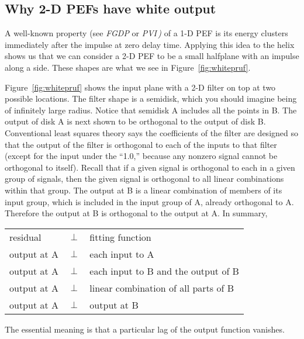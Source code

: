 \subsection{Why 2-D PEFs have white output} 

A well-known property  (see {\em FGDP} or {\em PVI\,) }
of a 1-D PEF is its energy clusters immediately after the
impulse at zero delay time.
Applying this idea to
the helix %
shows us that we can consider a 2-D PEF
to be a small halfplane %
with an impulse along a side.
These shapes are what we see in
Figure~\ref{fig:whitepruf}.


\par
Figure~\ref{fig:whitepruf} shows the input plane with a 2-D filter on top
at two possible locations.
The filter shape is a semidisk,
which you should imagine being of
infinitely large radius.
Notice that semidisk A includes all the points in B.
The output of disk A is next shown to be orthogonal to the output
of disk B.
Conventional least squares theory says the coefficients of the filter
are designed so that the output of the filter
is orthogonal to each of the inputs to that filter
(except for the input under the ``1.0,''
because any nonzero signal cannot be orthogonal to itself).
Recall that if a given signal is orthogonal to each in a given group of signals,
then the given signal is orthogonal
to all linear combinations within that group.
The output at B is a linear combination of members
of its input group,
which is included in the input group of A,
already orthogonal to A.
Therefore the output at B is orthogonal to the output at A.
In summary,
\par            %
\begin{tabular}{lll}
residual     & $\perp$ &  fitting function \\
output at A  & $\perp$ &  each input to A \\
output at A  & $\perp$ &  each input to B and the output of B\\
output at A  & $\perp$ &  linear combination of all parts of B \\
output at A  & $\perp$ &  output at B
\end{tabular}
\par            %
\noindent
The essential meaning is that
a particular lag of the output  function vanishes.

